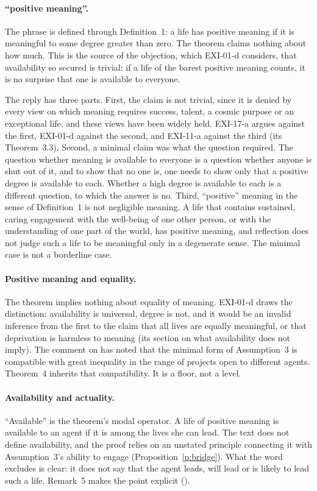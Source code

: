 \paragraph{\enquote{positive meaning}.} The phrase is defined through Definition~1: a life has positive meaning if it is meaningful to some degree greater than zero. The theorem claims nothing about how much. This is the source of the objection, which EXI-01-d considers, that availability so secured is trivial: if a life of the barest positive meaning counts, it is no surprise that one is available to everyone.

The reply has three parts. First, the claim is not trivial, since it is denied by every view on which meaning requires success, talent, a cosmic purpose or an exceptional life, and these views have been widely held. EXI-17-a argues against the first, EXI-01-d against the second, and EXI-11-a against the third (its Theorem~3.3). Second, a minimal claim was what the question required. The question whether meaning is available to everyone is a question whether anyone is shut out of it, and to show that no one is, one needs to show only that a positive degree is available to each. Whether a high degree is available to each is a different question, to which the answer is no. Third, \enquote{positive} meaning in the sense of Definition~1 is not negligible meaning. A life that contains sustained, caring engagement with the well-being of one other person, or with the understanding of one part of the world, has positive meaning, and reflection does not judge such a life to be meaningful only in a degenerate sense. The minimal case is not a borderline case.

\paragraph{Positive meaning and equality.} The theorem implies nothing about equality of meaning. EXI-01-d draws the distinction: availability is universal, degree is not, and it would be an invalid inference from the first to the claim that all lives are equally meaningful, or that deprivation is harmless to meaning (its section on what availability does not imply). The comment on  has noted that the minimal form of Assumption~3 is compatible with great inequality in the range of projects open to different agents. Theorem~4 inherits that compatibility. It is a floor, not a level.


\paragraph{Availability and actuality.} \enquote{Available} is the theorem's modal operator. A life of positive meaning is available to an agent if it is among the lives she can lead. The text does not define availability, and the proof relies on an unstated principle connecting it with Assumption~3's ability to engage (Proposition~\ref{p:bridge}). What the word excludes is clear: it does not say that the agent leads, will lead or is likely to lead such a life. Remark~5 makes the point explicit ().

